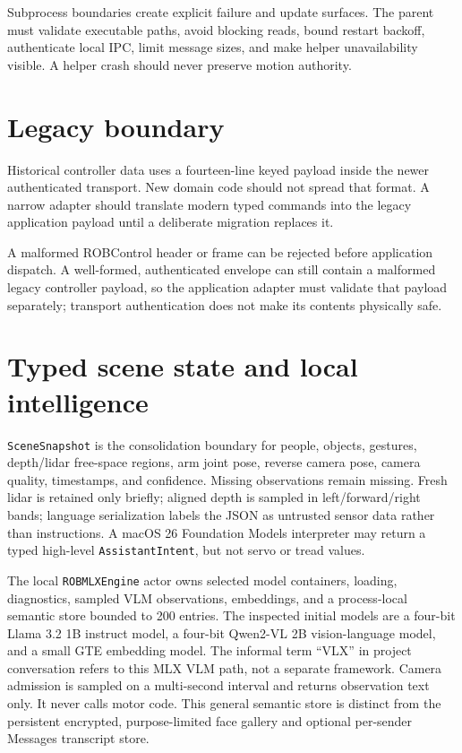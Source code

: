 \documentclass[10pt,openany]{book}
\begin{document}
\begin{advancedbox}
Subprocess boundaries create explicit failure and update surfaces. The parent must validate executable paths, avoid blocking reads, bound restart backoff, authenticate local IPC, limit message sizes, and make helper unavailability visible. A helper crash should never preserve motion authority.
\end{advancedbox}

\section{Legacy boundary}

\Legacy\quad Historical controller data uses a fourteen-line keyed payload inside the newer authenticated transport. New domain code should not spread that format. A narrow adapter should translate modern typed commands into the legacy application payload until a deliberate migration replaces it.

A malformed ROBControl header or frame can be rejected before application dispatch. A well-formed, authenticated envelope can still contain a malformed legacy controller payload, so the application adapter must validate that payload separately; transport authentication does not make its contents physically safe.

\section{Typed scene state and local intelligence}

\texttt{SceneSnapshot} is the consolidation boundary for people, objects, gestures, depth/lidar free-space regions, arm joint pose, reverse camera pose, camera quality, timestamps, and confidence. Missing observations remain missing. Fresh lidar is retained only briefly; aligned depth is sampled in left/forward/right bands; language serialization labels the JSON as untrusted sensor data rather than instructions. A macOS 26 Foundation Models interpreter may return a typed high-level \texttt{AssistantIntent}, but not servo or tread values.

The local \texttt{ROBMLXEngine} actor owns selected model containers, loading, diagnostics, sampled VLM observations, embeddings, and a process-local semantic store bounded to 200 entries. The inspected initial models are a four-bit Llama 3.2 1B instruct model, a four-bit Qwen2-VL 2B vision-language model, and a small GTE embedding model. The informal term ``VLX'' in project conversation refers to this MLX VLM path, not a separate framework. Camera admission is sampled on a multi-second interval and returns observation text only. It never calls motor code. This general semantic store is distinct from the persistent encrypted, purpose-limited face gallery and optional per-sender Messages transcript store.
\end{document}
